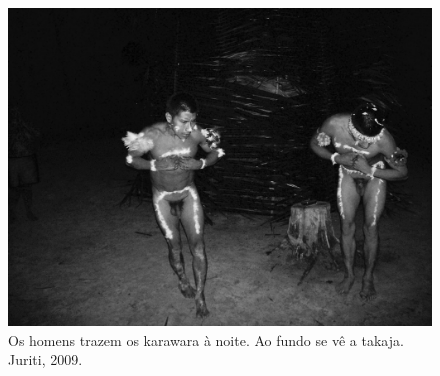 \begin{figure}[H]
\centering
  \includegraphics[width=\textwidth]{./imgs/100_1695}
\caption{Os homens trazem os karawara à noite. Ao fundo se vê a takaja. Juriti, 2009.}
\end{figure}

